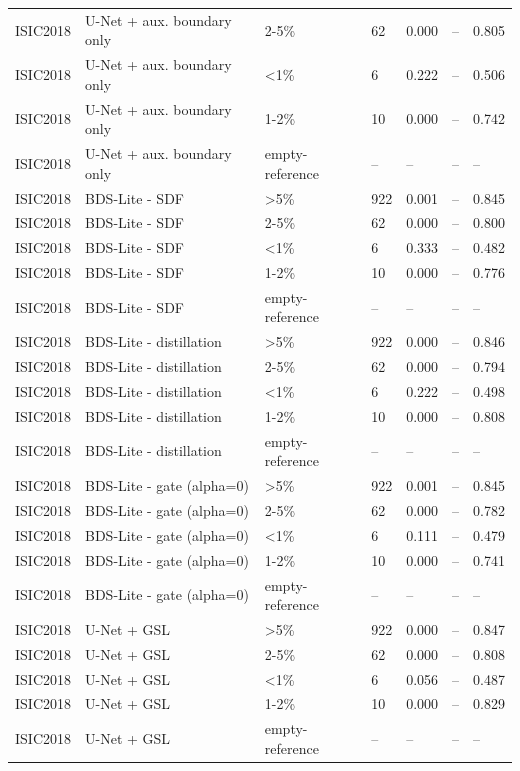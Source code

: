 \begin{tabular}{lllllll}
ISIC2018 & U-Net + aux. boundary only & 2-5\% & 62 & 0.000 & -- & 0.805 \\
ISIC2018 & U-Net + aux. boundary only & <1\% & 6 & 0.222 & -- & 0.506 \\
ISIC2018 & U-Net + aux. boundary only & 1-2\% & 10 & 0.000 & -- & 0.742 \\
ISIC2018 & U-Net + aux. boundary only & empty-reference & -- & -- & -- & -- \\
ISIC2018 & BDS-Lite - SDF & >5\% & 922 & 0.001 & -- & 0.845 \\
ISIC2018 & BDS-Lite - SDF & 2-5\% & 62 & 0.000 & -- & 0.800 \\
ISIC2018 & BDS-Lite - SDF & <1\% & 6 & 0.333 & -- & 0.482 \\
ISIC2018 & BDS-Lite - SDF & 1-2\% & 10 & 0.000 & -- & 0.776 \\
ISIC2018 & BDS-Lite - SDF & empty-reference & -- & -- & -- & -- \\
ISIC2018 & BDS-Lite - distillation & >5\% & 922 & 0.000 & -- & 0.846 \\
ISIC2018 & BDS-Lite - distillation & 2-5\% & 62 & 0.000 & -- & 0.794 \\
ISIC2018 & BDS-Lite - distillation & <1\% & 6 & 0.222 & -- & 0.498 \\
ISIC2018 & BDS-Lite - distillation & 1-2\% & 10 & 0.000 & -- & 0.808 \\
ISIC2018 & BDS-Lite - distillation & empty-reference & -- & -- & -- & -- \\
ISIC2018 & BDS-Lite - gate (alpha=0) & >5\% & 922 & 0.001 & -- & 0.845 \\
ISIC2018 & BDS-Lite - gate (alpha=0) & 2-5\% & 62 & 0.000 & -- & 0.782 \\
ISIC2018 & BDS-Lite - gate (alpha=0) & <1\% & 6 & 0.111 & -- & 0.479 \\
ISIC2018 & BDS-Lite - gate (alpha=0) & 1-2\% & 10 & 0.000 & -- & 0.741 \\
ISIC2018 & BDS-Lite - gate (alpha=0) & empty-reference & -- & -- & -- & -- \\
ISIC2018 & U-Net + GSL & >5\% & 922 & 0.000 & -- & 0.847 \\
ISIC2018 & U-Net + GSL & 2-5\% & 62 & 0.000 & -- & 0.808 \\
ISIC2018 & U-Net + GSL & <1\% & 6 & 0.056 & -- & 0.487 \\
ISIC2018 & U-Net + GSL & 1-2\% & 10 & 0.000 & -- & 0.829 \\
ISIC2018 & U-Net + GSL & empty-reference & -- & -- & -- & -- \\

\end{tabular}
